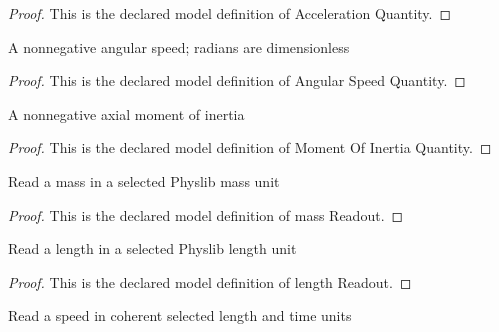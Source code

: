 \begin{proof}
  This is the declared model definition of Acceleration Quantity.
\end{proof}
\begin{definition}
  \label{def:physics:phyx-mini-0779:phyxminiproblems-problemphyxmini0779-angularspeedquantity}
  A nonnegative angular speed; radians are dimensionless
\end{definition}
\begin{proof}
  This is the declared model definition of Angular Speed Quantity.
\end{proof}
\begin{definition}
  \label{def:physics:phyx-mini-0779:phyxminiproblems-problemphyxmini0779-momentofinertiaquantity}
  A nonnegative axial moment of inertia
\end{definition}
\begin{proof}
  This is the declared model definition of Moment Of Inertia Quantity.
\end{proof}
\begin{definition}
  \label{def:physics:phyx-mini-0779:phyxminiproblems-problemphyxmini0779-massreadout}
  Read a mass in a selected Physlib mass unit
\end{definition}
\begin{proof}
  This is the declared model definition of mass Readout.
\end{proof}
\begin{definition}
  \label{def:physics:phyx-mini-0779:phyxminiproblems-problemphyxmini0779-lengthreadout}
  Read a length in a selected Physlib length unit
\end{definition}
\begin{proof}
  This is the declared model definition of length Readout.
\end{proof}
\begin{definition}
  \label{def:physics:phyx-mini-0779:phyxminiproblems-problemphyxmini0779-speedreadout}
  Read a speed in coherent selected length and time units
\end{definition}
